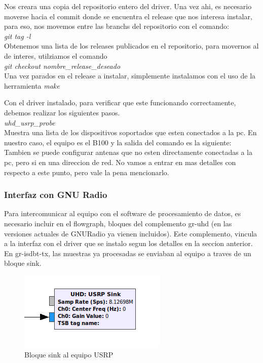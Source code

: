 Nos creara una copia del repositorio entero del driver. Una vez ahi, es necesario moverse hacia el commit donde se encuentra el release que nos interesa instalar, para eso, nos movemos entre las branchs del repositorio con el comando:\\

\textit{git tag -l}\\


Obtenemos una lista de los releases publicados en el repositorio, para movernos al de interes, utilziamos el comando \\

\textit{git checkout nombre\_release\_deseado} \\

Una vez parados en el release a instalar, simplemente instalamos con el uso de la herramienta \textit{make}

Con el driver instalado, para verificar que este funcionando correctamente, debemos realizar los siguientes pasos.\\

\textit{uhd\_usrp\_probe}\\

Muestra una lista de los dispositivos soportados que esten conectados a la pc. En nuestro caso, el equipo es el B100 y la salida del comando es la siguiente:\\

Tambien se puede configurar antenas que no esten directamente conectadas a la pc, pero si en una direccion de red. No vamos a entrar en mas detalles con respecto a este punto, pero vale la pena mencionarlo.

\subsubsection{Interfaz con GNU Radio}

Para intercomunicar al equipo con el software de procesamiento de datos, es necesario incluir en el flowgraph, bloques del complemento gr-uhd (en las versiones actuales de GNURadio ya vienen incluidos). Este complemento, vincula a la interfaz con el driver que se instalo segun los detalles en la seccion anterior. En gr-isdbt-tx, las muestras ya procesadas se enviaban al equipo a traves de un bloque sink.  

\begin{figure}[h!]
	\centering
	\includegraphics[scale=0.55]{figuras/cap04/sink_block}
	\caption{\label{f:sink_block} Bloque sink al equipo USRP}
\end{figure}

